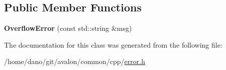 \subsection*{Public Member Functions}
\begin{DoxyCompactItemize}
\item 
\mbox{\label{classtcf_1_1error_1_1OverflowError_ab294ff2ac1857c4e748839ce24f0e585}} 
{\bfseries Overflow\+Error} (const std\+::string \&msg)
\end{DoxyCompactItemize}


The documentation for this class was generated from the following file\+:\begin{DoxyCompactItemize}
\item 
/home/dano/git/avalon/common/cpp/\hyperlink{error_8h}{error.\+h}\end{DoxyCompactItemize}
